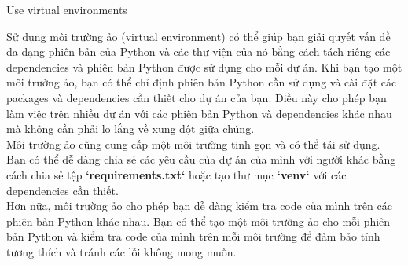 \documentclass[12pt]{amsart}
\begin{document}
\begin{section}{Use virtual environments}

    Sử dụng môi trường ảo (virtual environment) có thể giúp bạn giải quyết vấn đề đa dạng phiên bản của Python và các thư viện của nó bằng cách tách riêng các dependencies và phiên bản Python được sử dụng cho mỗi dự án. Khi bạn tạo một môi trường ảo, bạn có thể chỉ định phiên bản Python cần sử dụng và cài đặt các packages và dependencies cần thiết cho dự án của bạn. Điều này cho phép bạn làm việc trên nhiều dự án với các phiên bản Python và dependencies khác nhau mà không cần phải lo lắng về xung đột giữa chúng. \\


    Môi trường ảo cũng cung cấp một môi trường tinh gọn và có thể tái sử dụng. Bạn có thể dễ dàng chia sẻ các yêu cầu của dự án của mình với người khác bằng cách chia sẻ tệp \textbf{`requirements.txt`} hoặc tạo thư mục \textbf{`venv`} với các dependencies cần thiết. \\

    Hơn nữa, môi trường ảo cho phép bạn dễ dàng kiểm tra code của mình trên các phiên bản Python khác nhau. Bạn có thể tạo một môi trường ảo cho mỗi phiên bản Python và kiểm tra code của mình trên mỗi môi trường để đảm bảo tính tương thích và tránh các lỗi không mong muốn.

\end{section}
\end{document}
